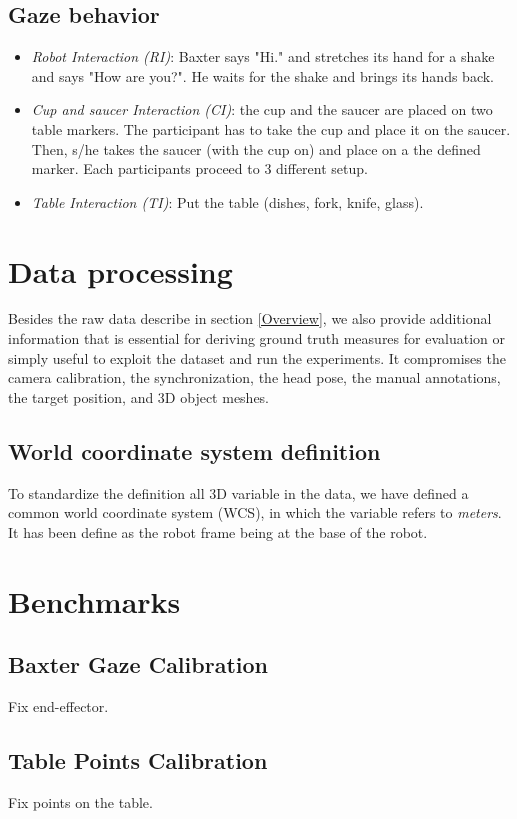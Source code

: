 \documentclass[11pt,a4paper]{article}
\begin{document}
\subsection{Gaze behavior}
\begin{itemize}
\item \textit{Robot Interaction (RI)}: Baxter says "Hi." and stretches its hand for a shake and says "How are you?". He waits for the shake and brings its hands back.
\item \textit{Cup and saucer Interaction (CI)}: the cup and the saucer are placed on two table markers. The participant has to take the cup and place it on the saucer. Then, s/he takes the saucer (with the cup on) and place on a the defined marker. Each participants proceed to 3 different setup.
\item \textit{Table Interaction (TI)}: Put the table (dishes, fork, knife, glass).
\end{itemize}

\section{Data processing}
Besides the raw data describe in section \ref{Overview}, we also provide additional information that is essential for deriving ground truth measures for evaluation or simply useful to exploit the dataset and run the experiments. It compromises the camera calibration, the synchronization, the head pose, the manual annotations, the target position, and 3D object meshes.

\subsection{World coordinate system definition}
To standardize the definition all 3D variable in the data, we have defined a common world coordinate system (WCS), in which the variable refers to \textit{meters}. It has been define as the robot frame being at the base of the robot.

\section{Benchmarks}
\label{Benchmarks}

\clearpage

\subsection{Baxter Gaze Calibration}
Fix end-effector.
\subsection{Table Points Calibration}
Fix points on the table.
\end{document}
